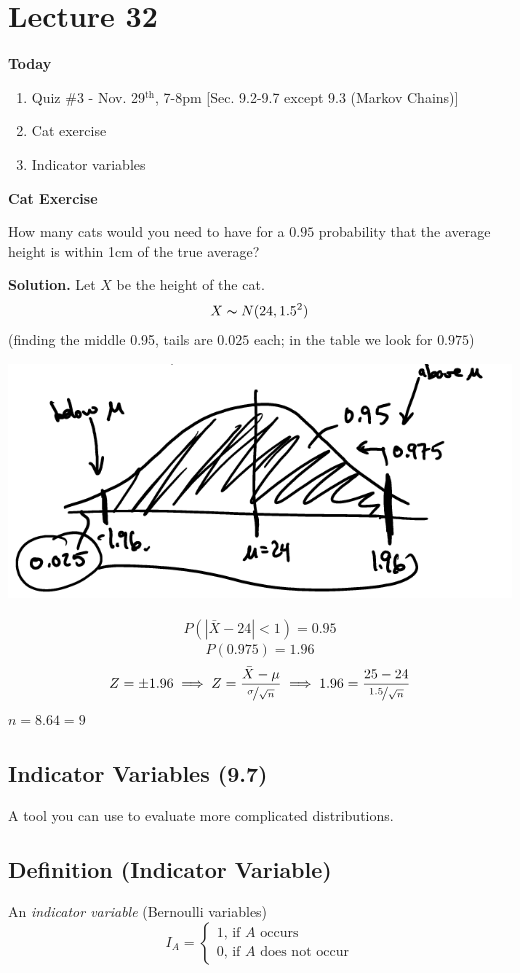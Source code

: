 \section{Lecture 32}
\textbf{Today}
\begin{enumerate}[1.]
    \item Quiz \#3 - Nov. 29$^\text{th}$, 7-8pm [Sec. 9.2-9.7 except 9.3 (Markov Chains)]
    \item Cat exercise
    \item Indicator variables
\end{enumerate}
\textbf{Cat Exercise}

How many cats would you need to have for a $ 0.95 $ probability
that the average height is within 1cm of the true average? 

\textbf{Solution.}
Let $ X $ be the height of the cat.
\[ X \thicksim N(24,1.5^2) \]
(finding the middle 0.95, tails are $ 0.025 $ each; in the table we look
for $ 0.975 $)

\begin{center}
    \includegraphics{catscurve.png}
\end{center}
\begin{align*}
    P\left(\left|\bar{X}-24\right|<1\right)=0.95
\end{align*}
\[ P(0.975)=1.96 \]
\[ Z=\pm 1.96\implies Z=\frac{\bar{X}-\mu}{\nicefrac{\sigma}{\sqrt{n}}}
\implies 1.96=\frac{25-24}{\nicefrac{1.5}{\sqrt{n}}} \]
$ n=8.64=9 $

\subsection{Indicator Variables (9.7)}
A tool you can use to evaluate more complicated distributions.

\begin{defbox}
    \subsection{Definition (Indicator Variable)}
    An \emph{indicator variable} (Bernoulli variables)
    \[ I_A=
    \begin{cases}
        1,\,\text{if $A$ occurs}\\
        0,\,\text{if $A$ does not occur}
    \end{cases} \]
\end{defbox}

